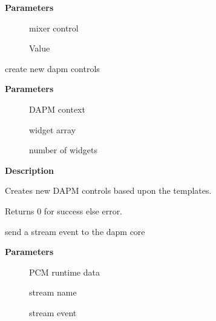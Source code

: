 \documentclass[a4paper,8pt,english]{sphinxmanual}
\begin{document}
\textbf{Parameters}
\begin{description}
\item[{}] \leavevmode
mixer control

\item[{}] \leavevmode
Value

\end{description}

\begin{fulllineitems}
\label{sound/kernel-api/alsa-driver-api:c.snd_soc_dapm_new_controls}
create new dapm controls

\end{fulllineitems}


\textbf{Parameters}
\begin{description}
\item[{}] \leavevmode
DAPM context

\item[{}] \leavevmode
widget array

\item[{}] \leavevmode
number of widgets

\end{description}

\textbf{Description}

Creates new DAPM controls based upon the templates.

Returns 0 for success else error.

\begin{fulllineitems}
\label{sound/kernel-api/alsa-driver-api:c.snd_soc_dapm_stream_event}
send a stream event to the dapm core

\end{fulllineitems}


\textbf{Parameters}
\begin{description}
\item[{}] \leavevmode
PCM runtime data

\item[{}] \leavevmode
stream name

\item[{}] \leavevmode
stream event

\end{description}
\end{document}
